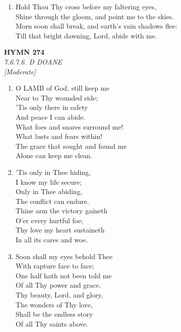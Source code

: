 \begin{enumerate}
    \item Hold Thou Thy cross before my faltering eyes, \\
        Shine through the gloom, and point me to the skies. \\
        Morn soon shall break, and earth's vain shadows flee: \\
        Till that bright dawning, Lord, abide with me.

\end{enumerate}

\newpage
\begin{center}
    {\Large \textbf{HYMN 274}}
    \\
    \textit{7.6.7.6. D DOANE}
    \\
    \textit{\small [Moderate]}
\end{center}
\vspace{1em}

\begin{enumerate}
    \item O LAMB of God, still keep me \\
        Near to Thy wounded side; \\
        'Tis only there in safety \\
        And peace I can abide. \\
        What foes and snares surround me! \\
        What lusts and fears within! \\
        The grace that sought and found me \\
        Alone can keep me clean.

    \item 'Tis only in Thee hiding, \\
        I know my life secure; \\
        Only in Thee abiding, \\
        The conflict can endure. \\
        Thine arm the victory gaineth \\
        O'er every hurtful foe; \\
        Thy love my heart sustaineth \\
        In all its cares and woe.

    \item Soon shall my eyes behold Thee \\
        With rapture face to face; \\
        One half hath not been told me \\
        Of all Thy power and grace. \\
        Thy beauty, Lord, and glory, \\
        The wonders of Thy love, \\
        Shall be the endless story \\
        Of all Thy saints above.

\end{enumerate}

